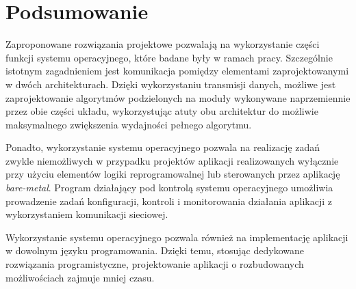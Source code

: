 \section*{Podsumowanie}

Zaproponowane rozwiązania projektowe pozwalają na wykorzystanie części funkcji systemu operacyjnego, które badane były w ramach pracy. 
Szczególnie istotnym zagadnieniem jest komunikacja pomiędzy elementami zaprojektowanymi w dwóch architekturach. 
Dzięki wykorzystaniu transmisji danych, możliwe jest zaprojektowanie algorytmów podzielonych na moduły wykonywane naprzemiennie przez obie części układu, wykorzystując atuty obu architektur do możliwie maksymalnego zwiększenia wydajności pełnego algorytmu.

Ponadto, wykorzystanie systemu operacyjnego pozwala na realizację zadań zwykle niemożliwych w przypadku projektów aplikacji realizowanych wyłącznie przy użyciu elementów logiki reprogramowalnej lub sterowanych przez aplikację \textit{bare-metal}. 
Program działający pod kontrolą systemu operacyjnego umożliwia prowadzenie zadań konfiguracji, kontroli i monitorowania działania aplikacji z wykorzystaniem komunikacji sieciowej.

Wykorzystanie systemu operacyjnego pozwala również na implementację aplikacji w dowolnym języku programowania. 
Dzięki temu, stosując dedykowane rozwiązania programistyczne, projektowanie aplikacji o rozbudowanych możliwościach zajmuje mniej czasu.

